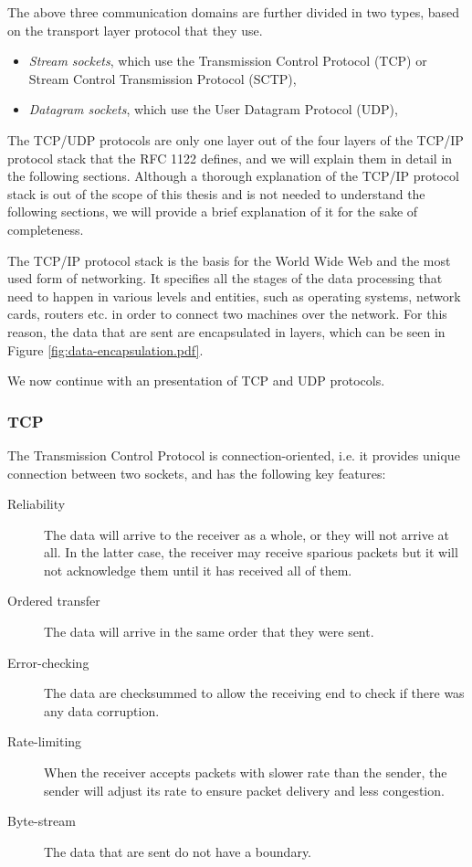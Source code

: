 The above three communication domains are further divided in two types, based 
on the transport layer protocol that they use.

\begin{itemize}
	\item \textit{Stream sockets}, which use the Transmission Control 
		Protocol (TCP) or Stream Control Transmission Protocol (SCTP),
	\item \textit{Datagram sockets}, which use the User Datagram Protocol 
		(UDP),
\end{itemize}

The TCP/UDP protocols are only one layer out of the four layers of the TCP/IP 
protocol stack that the RFC 1122\cite{1122} defines, and we will explain them 
in detail in the following sections.  Although a thorough explanation of the 
TCP/IP protocol stack is out of the scope of this thesis and is not needed to 
understand the following sections, we will provide a brief explanation of it 
for the sake of completeness.  

The TCP/IP protocol stack is the basis for the World Wide Web and the most used 
form of networking. It specifies all the stages of the data processing that 
need to happen in various levels and entities, such as operating systems, 
network cards, routers etc. in order to connect two machines over the network.  
For this reason, the data that are sent are encapsulated in layers, which can 
be seen in Figure \ref{fig:data-encapsulation.pdf}.


We now continue with an presentation of TCP and UDP protocols.

\subsubsection{TCP}

The Transmission Control Protocol is connection-oriented, i.e. it provides 
unique connection between two sockets, and has the following key features:

\begin{description}
	\item[Reliability] The data will arrive to the receiver as a whole, or 
		they will not arrive at all. In the latter case, the receiver 
		may receive sparious packets but it will not acknowledge them 
		until it has received all of them.
	\item[Ordered transfer] The data will arrive in the same order that 
		they were sent.
	\item[Error-checking] The data are checksummed to allow the receiving 
		end to check if there was any data corruption.
	\item[Rate-limiting] When the receiver accepts packets with slower rate 
		than the sender, the sender will adjust its rate to ensure 
		packet delivery and less congestion.
	\item[Byte-stream] The data that are sent do not have a boundary.
\end{description}


